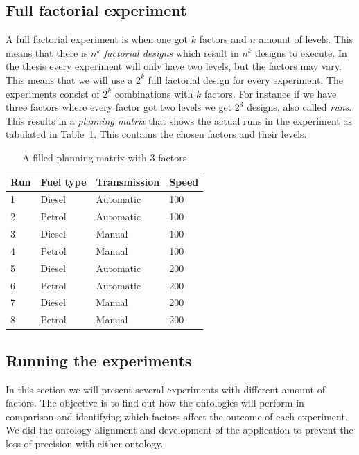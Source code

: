 \documentclass{llncs}
\begin{document}
\subsection{Full factorial experiment}
A full factorial experiment is when one got $k$ factors and $n$ amount
of levels. This means that there is $n^k$ \emph{factorial designs}
which result in $n^k$ designs to execute.  In the thesis every
experiment will only have two levels, but the factors may vary. This
means that we will use a $2^k$ full factorial design for every
experiment. The experiments consist of $2^k$ combinations with $k$
factors. For instance if we have three factors where every factor got
two levels we get $2^3$ designs, also called \emph{runs}. This results
in a \emph{planning matrix} that shows the actual runs in the
experiment as tabulated in Table~\ref{designsspec}. This contains the
chosen factors and their levels.


\begin{table}
\begin{center}
    \begin{tabular}{ | l | l  l  l |}
    \hline
    {\bf Run} &  {\bf Fuel type} & {\bf Transmission} & {\bf Speed} \\ \hline
	 1 & Diesel & Automatic & 100 \\ \hline
	 2 & Petrol & Automatic & 100 \\ \hline
	 3 & Diesel & Manual & 100 \\ \hline
	 4 & Petrol & Manual & 100 \\ \hline
	 5 & Diesel & Automatic & 200 \\ \hline
	 6 & Petrol & Automatic & 200 \\ \hline
	 7 & Diesel & Manual & 200 \\ \hline
	 8 & Petrol & Manual &  200 \\ \hline
    \end{tabular}
\end{center}
\caption{A filled planning matrix with 3 factors}\label{designsspec}
\end{table}


\subsection{Running the experiments}
In this section we will present several experiments with different
amount of factors.  The objective is to find out how the ontologies
will perform in comparison and identifying which factors affect the
outcome of each experiment. We did the ontology alignment and
development of the application to prevent the loss of precision with
either ontology.
\end{document}
